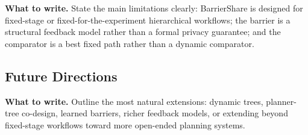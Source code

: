 \documentclass{article}
\newcommand{\towrite}[1]{\noindent\textbf{What to write.} #1}
\begin{document}
\towrite{State the main limitations clearly: BarrierShare is designed for fixed-stage or fixed-for-the-experiment hierarchical workflows; the barrier is a structural feedback model rather than a formal privacy guarantee; and the comparator is a best fixed path rather than a dynamic comparator.}

\subsection{Future Directions}

\towrite{Outline the most natural extensions: dynamic trees, planner-tree co-design, learned barriers, richer feedback models, or extending beyond fixed-stage workflows toward more open-ended planning systems.}
\end{document}

